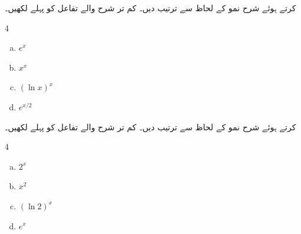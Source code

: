  کرتے ہوئے شرح نمو کے لحاظ سے ترتیب دیں۔ کم تر شرح والے تفاعل کو پہلے لکھیں۔ 
\begin{multicols}{4}
\begin{enumerate}[a.]
\item
$e^x$
\item
$x^x$
\item
$(\ln x)^x$
\item
$e^{x/2}$
\end{enumerate}
\end{multicols}
 کرتے ہوئے شرح نمو کے لحاظ سے ترتیب دیں۔ کم تر شرح والے تفاعل کو پہلے لکھیں۔ 
\begin{multicols}{4}
\begin{enumerate}[a.]
\item
$2^x$
\item
$x^2$
\item
$(\ln 2)^x$
\item
$e^x$
\end{enumerate}
\end{multicols}

